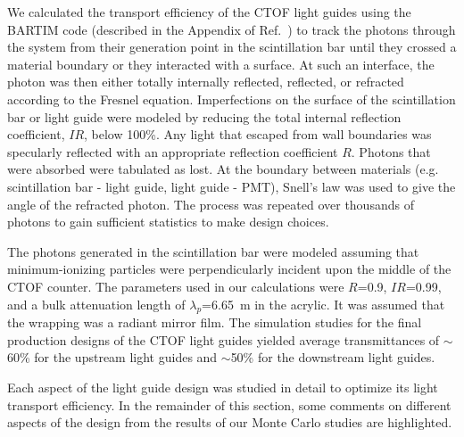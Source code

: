 \documentclass{elsart}
\begin{document}
We calculated the transport efficiency of the CTOF light guides using the BARTIM code
(described in the Appendix of Ref.~\cite{mutch}) to track the photons through the system
from their generation point in the scintillation bar until they crossed a material boundary
or they interacted with a surface. At such an interface, the photon was then either totally 
internally reflected, reflected, or refracted according to the Fresnel equation. Imperfections 
on the surface of the scintillation bar or light guide were modeled by reducing the total 
internal reflection coefficient, $IR$, below 100\%. Any light that escaped from wall boundaries 
was specularly reflected with an appropriate reflection coefficient $R$. Photons that were 
absorbed were tabulated as lost. At the boundary between materials (e.g. scintillation bar - 
light guide, light guide - PMT), Snell's law was used to give the angle of the refracted 
photon. The process was repeated over thousands of photons to gain sufficient statistics to 
make design choices.

The photons generated in the scintillation bar were modeled assuming that minimum-ionizing
particles were perpendicularly incident upon the middle of the CTOF counter. The parameters
used in our calculations were $R$=0.9, $IR$=0.99, and a bulk attenuation length of
$\lambda_p$=6.65~m in the acrylic. It was assumed that the wrapping was a radiant mirror film.
The simulation studies for the final production designs of the CTOF light guides yielded average
transmittances of $\sim$60\% for the upstream light guides and $\sim$50\% for the
downstream light guides.

Each aspect of the light guide design was studied in detail to optimize its light transport 
efficiency. In the remainder of this section, some comments on different aspects of the 
design from the results of our Monte Carlo studies are highlighted.
\end{document}
